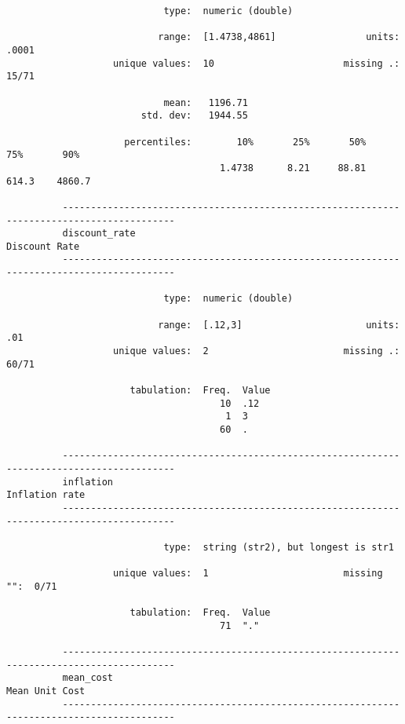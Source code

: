 \documentclass{article}
\begin{document}
\begin{verbatim}
                            type:  numeric (double)
          
                           range:  [1.4738,4861]                units:  .0001
                   unique values:  10                       missing .:  15/71
          
                            mean:   1196.71
                        std. dev:   1944.55
          
                     percentiles:        10%       25%       50%       75%       90%
                                      1.4738      8.21     88.81     614.3    4860.7
          
          ------------------------------------------------------------------------------------------
          discount_rate                                                                Discount Rate
          ------------------------------------------------------------------------------------------
          
                            type:  numeric (double)
          
                           range:  [.12,3]                      units:  .01
                   unique values:  2                        missing .:  60/71
          
                      tabulation:  Freq.  Value
                                      10  .12
                                       1  3
                                      60  .
          
          ------------------------------------------------------------------------------------------
          inflation                                                                   Inflation rate
          ------------------------------------------------------------------------------------------
          
                            type:  string (str2), but longest is str1
          
                   unique values:  1                        missing "":  0/71
          
                      tabulation:  Freq.  Value
                                      71  "."
          
          ------------------------------------------------------------------------------------------
          mean_cost                                                                   Mean Unit Cost
          ------------------------------------------------------------------------------------------
          

\end{verbatim}
\end{document}
